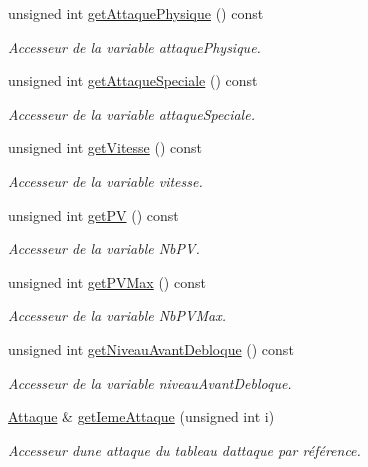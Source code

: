 \begin{DoxyCompactItemize}
unsigned int \hyperlink{class_pokemon_a27ae3d139d0c958b2f605743eb8f8a6d}{get\+Attaque\+Physique} () const
\begin{DoxyCompactList}\small\item\em Accesseur de la variable attaque\+Physique. \end{DoxyCompactList}\item 
unsigned int \hyperlink{class_pokemon_ace1c2940d8870b907cc2b0cd29f6efba}{get\+Attaque\+Speciale} () const
\begin{DoxyCompactList}\small\item\em Accesseur de la variable attaque\+Speciale. \end{DoxyCompactList}\item 
unsigned int \hyperlink{class_pokemon_a04a02b9ee3a43d25596b6d934ef861ba}{get\+Vitesse} () const
\begin{DoxyCompactList}\small\item\em Accesseur de la variable vitesse. \end{DoxyCompactList}\item 
unsigned int \hyperlink{class_pokemon_a97e2f2b4b811d5e2bbcb038fb70f57ce}{get\+PV} () const
\begin{DoxyCompactList}\small\item\em Accesseur de la variable Nb\+PV. \end{DoxyCompactList}\item 
unsigned int \hyperlink{class_pokemon_af11b525fb21bb7fbb86c43d1ddad738a}{get\+P\+V\+Max} () const
\begin{DoxyCompactList}\small\item\em Accesseur de la variable Nb\+P\+V\+Max. \end{DoxyCompactList}\item 
unsigned int \hyperlink{class_pokemon_a84a91b991611246fa387ede48e18d357}{get\+Niveau\+Avant\+Debloque} () const
\begin{DoxyCompactList}\small\item\em Accesseur de la variable niveau\+Avant\+Debloque. \end{DoxyCompactList}\item 
\hyperlink{class_attaque}{Attaque} \& \hyperlink{class_pokemon_aad16e1f997ee22fe4f0ec385c5bdbc55}{get\+Ieme\+Attaque} (unsigned int i)
\begin{DoxyCompactList}\small\item\em Accesseur d\textquotesingle{}une attaque du tableau d\textquotesingle{}attaque par référence. \end{DoxyCompactList}\item 

\end{DoxyCompactItemize}
